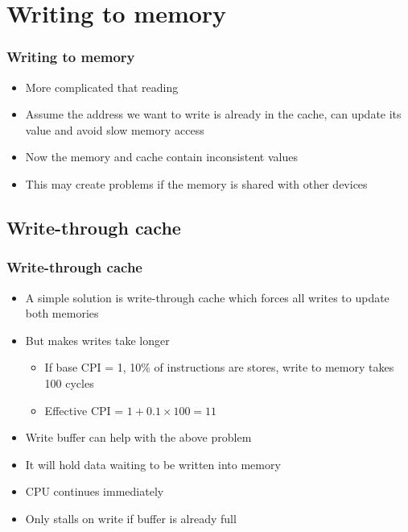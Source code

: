 \documentclass{beamer}
\begin{document}
\section{Writing to memory}
\begin{frame}
\frametitle{Writing to memory}
\begin{itemize}
\item More complicated that reading
\item Assume the address we want to write is already in the cache, can update its value and avoid slow memory access
\item Now the memory and cache contain inconsistent values
\item This may create problems if the memory is shared with other devices
\end{itemize}
\end{frame}
\subsection{Write-through cache}
\begin{frame}
\frametitle{Write-through cache}
\begin{itemize}
\item A simple solution is  {\color{red}write-through cache} which forces all writes to update both memories
\item But makes writes take longer
\begin{itemize}
\item If base CPI = 1, 10\% of instructions are stores, write to memory takes 100 cycles
\item Effective CPI = $1 + 0.1\times 100 = 11$
\end{itemize}
\item {\color{green} Write buffer} can help with the above problem
\item It will hold data waiting to be written into memory
\item CPU continues immediately
\item Only stalls on write if buffer is already full
\end{itemize}
\end{frame}
\end{document}
